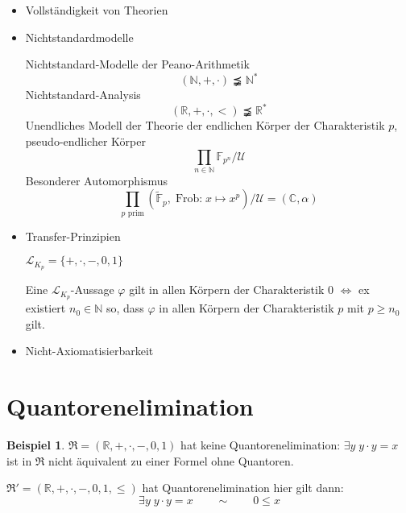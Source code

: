 \documentclass[12pt,parskip=full]{scrartcl}
\newcommand{\setN}{\mathbb{N}}
\newcommand{\setR}{\mathbb{R}}
\newcommand{\setC}{\mathbb{C}}
\theoremstyle{definition}
\newtheorem{example}[theorem]{Beispiel}
\begin{document}
	\begin{itemize}
		\item Vollständigkeit von Theorien
		\item Nichtstandardmodelle
		
		Nichtstandard-Modelle der Peano-Arithmetik
		\begin{equation*}
			(\setN, +, \cdot) \precneqq \setN^*
		\end{equation*}
		Nichtstandard-Analysis
		\begin{equation*}
			(\setR, +, \cdot, <) \precneqq \setR^*
		\end{equation*}
		Unendliches Modell der Theorie der endlichen Körper der Charakteristik $p$, pseudo-endlicher Körper
		\begin{equation*}
			\prod_{n \in \setN} \mathbb{F}_{p^n} / \mathcal{U}
		\end{equation*}
		Besonderer Automorphismus
		\begin{equation*}
			\prod_{p \text{ prim}} (\tilde{\mathbb{F}}_p, \operatorname{Frob:} x \mapsto x^p) / \mathcal{U} = (\setC, \alpha)
		\end{equation*}
		
		\item Transfer-Prinzipien
		
		$\mathcal{L}_{K_p} = \{ +, \cdot, -, 0, 1 \}$
		
		Eine $\mathcal{L}_{K_p}$-Aussage $\varphi$ gilt in allen Körpern der Charakteristik $0$ $\Leftrightarrow$ ex existiert $n_0 \in \setN$ so, dass $\varphi$ in allen Körpern der Charakteristik $p$ mit $p \geq n_0$ gilt.
		
		\item Nicht-Axiomatisierbarkeit
	\end{itemize}

	\section{Quantorenelimination}
	
	\begin{example}
		$\mathfrak{R} = (\setR, +, \cdot, -, 0, 1)$ hat keine Quantorenelimination: $\exists y \; y \cdot y = x$ ist in $\mathfrak{R}$ nicht äquivalent zu einer Formel ohne Quantoren.
		
		$\mathfrak{R}' = (\setR, +, \cdot, -, 0, 1, \leq)$ hat Quantorenelimination hier gilt dann:
		\begin{equation*}
			\exists y \; y \cdot y = x \qquad \sim \qquad 0 \leq x
		\end{equation*}
	\end{example}
\end{document}

